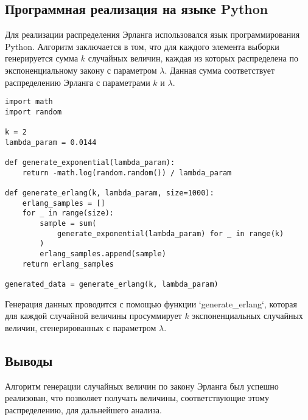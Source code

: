 \subsection{Программная реализация на языке Python}

Для реализации распределения Эрланга использовался язык программирования Python. Алгоритм заключается в том, что для каждого элемента выборки генерируется сумма \( k \) случайных величин, каждая из которых распределена по экспоненциальному закону с параметром \( \lambda \). Данная сумма соответствует распределению Эрланга с параметрами \( k \) и \( \lambda \).

\begin{lstlisting}
import math
import random

k = 2
lambda_param = 0.0144

def generate_exponential(lambda_param):
    return -math.log(random.random()) / lambda_param

def generate_erlang(k, lambda_param, size=1000):
    erlang_samples = []
    for _ in range(size):
        sample = sum(
            generate_exponential(lambda_param) for _ in range(k)
        )
        erlang_samples.append(sample)
    return erlang_samples

generated_data = generate_erlang(k, lambda_param)
\end{lstlisting}

Генерация данных проводится с помощью функции `generate\_erlang`, которая для каждой случайной величины просуммирует \( k \) экспоненциальных случайных величин, сгенерированных с параметром \( \lambda \).

\subsection{Выводы}

Алгоритм генерации случайных величин по закону Эрланга был успешно реализован, что позволяет получать величины, соответствующие этому распределению, для дальнейшего анализа.
